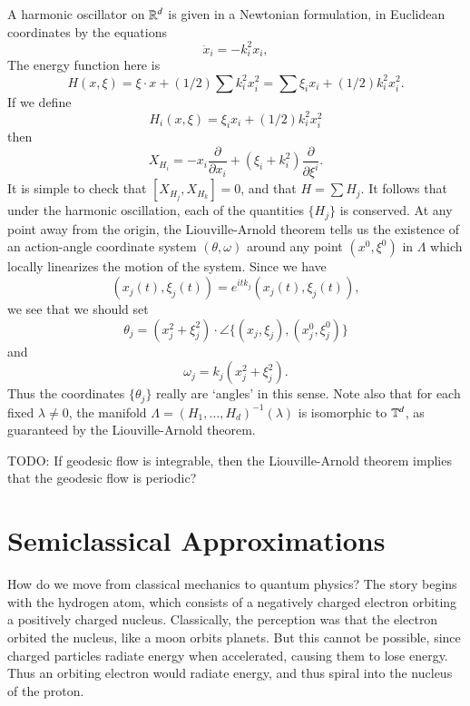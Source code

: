 \begin{example}
    A harmonic oscillator on $\operatorname{\mathbb{R}}^d$ is given in a Newtonian formulation, in Euclidean coordinates by the equations
    \[ \ddot{x}_i = - k_i^2 x_i, \]
    The energy function here is
    \[ H(x,\xi) = \xi \cdot x + (1/2) \sum k_i^2 x_i^2 = \sum \xi_i x_i + (1/2) k_i^2 x_i^2. \]
    If we define
    \[ H_i(x,\xi) = \xi_i x_i + (1/2) k_i^2 x_i^2 \]
    then
    \[ X_{H_i} = - x_i \frac{\partial}{\partial x_i} + (\xi_i + k_i^2) \frac{\partial}{\partial \xi^i}. \]
    It is simple to check that $[X_{H_j}, X_{H_k}] = 0$, and that $H = \sum H_j$. It follows that under the harmonic oscillation, each of the quantities $\{ H_j \}$ is conserved. At any point away from the origin, the Liouville-Arnold theorem tells us the existence of an action-angle coordinate system $(\theta,\omega)$ around any point $(x^0,\xi^0)$ in $\Lambda$ which locally linearizes the motion of the system. Since we have
    \[ (x_j(t), \xi_j(t)) = e^{itk_j} (x_j(t),\xi_j(t)), \]
    we see that we should set
    \[ \theta_j = (x_j^2 + \xi_j^2) \cdot \angle \{ (x_j,\xi_j), (x^0_j,\xi^0_j) \} \]
    and
    \[ \omega_j = k_j (x_j^2 + \xi_j^2). \]
    Thus the coordinates $\{ \theta_j \}$ really are `angles' in this sense. Note also that for each fixed $\lambda \neq 0$, the manifold $\Lambda = (H_1,\dots,H_d)^{-1}(\lambda)$ is isomorphic to $\operatorname{\mathbb{T}}^d$, as guaranteed by the Liouville-Arnold theorem.
\end{example}

TODO: If geodesic flow is integrable, then the Liouville-Arnold theorem implies that the geodesic flow is periodic?

\section{Semiclassical Approximations}

How do we move from classical mechanics to quantum physics? The story begins with the hydrogen atom, which consists of a negatively charged electron orbiting a positively charged nucleus. Classically, the perception was that the electron orbited the nucleus, like a moon orbits planets. But this cannot be possible, since charged particles radiate energy when accelerated, causing them to lose energy. Thus an orbiting electron would radiate energy, and thus spiral into the nucleus of the proton.

